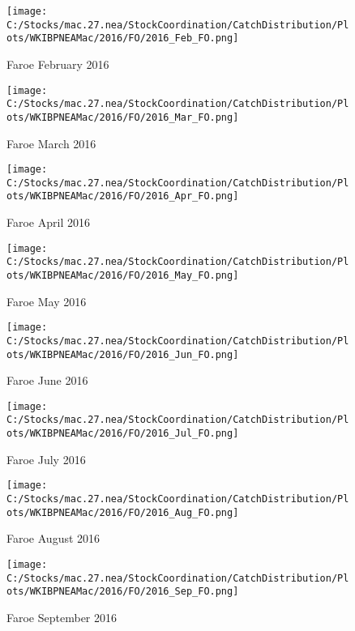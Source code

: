 \documentclass{article}
\begin{document}
\begin{figure}
	\centering
		\texttt{[image: C:/Stocks/mac.27.nea/StockCoordination/CatchDistribution/Plots/WKIBPNEAMac/2016/FO/2016\_Feb\_FO.png]}
	\caption{Faroe February 2016}
	\label{fig:2016_Feb_FO}
\end{figure}

\begin{figure}
	\centering
		\texttt{[image: C:/Stocks/mac.27.nea/StockCoordination/CatchDistribution/Plots/WKIBPNEAMac/2016/FO/2016\_Mar\_FO.png]}
	\caption{Faroe March 2016}
	\label{fig:2016_Mar_FO}
\end{figure}

\begin{figure}
	\centering
		\texttt{[image: C:/Stocks/mac.27.nea/StockCoordination/CatchDistribution/Plots/WKIBPNEAMac/2016/FO/2016\_Apr\_FO.png]}
	\caption{Faroe April 2016}
	\label{fig:2016_Apr_FO}
\end{figure}

\begin{figure}
	\centering
		\texttt{[image: C:/Stocks/mac.27.nea/StockCoordination/CatchDistribution/Plots/WKIBPNEAMac/2016/FO/2016\_May\_FO.png]}
	\caption{Faroe May 2016}
	\label{fig:2016_May_FO}
\end{figure}

\begin{figure}
	\centering
		\texttt{[image: C:/Stocks/mac.27.nea/StockCoordination/CatchDistribution/Plots/WKIBPNEAMac/2016/FO/2016\_Jun\_FO.png]}
	\caption{Faroe June 2016}
	\label{fig:2016_Jun_FO}
\end{figure}

\begin{figure}
	\centering
		\texttt{[image: C:/Stocks/mac.27.nea/StockCoordination/CatchDistribution/Plots/WKIBPNEAMac/2016/FO/2016\_Jul\_FO.png]}
	\caption{Faroe July 2016}
	\label{fig:2016_Jul_FO}
\end{figure}

\begin{figure}
	\centering
		\texttt{[image: C:/Stocks/mac.27.nea/StockCoordination/CatchDistribution/Plots/WKIBPNEAMac/2016/FO/2016\_Aug\_FO.png]}
	\caption{Faroe August 2016}
	\label{fig:2016_Aug_FO}
\end{figure}

\begin{figure}
	\centering
		\texttt{[image: C:/Stocks/mac.27.nea/StockCoordination/CatchDistribution/Plots/WKIBPNEAMac/2016/FO/2016\_Sep\_FO.png]}
	\caption{Faroe September 2016}
	\label{fig:2016_Sep_FO}
\end{figure}
\end{document}
